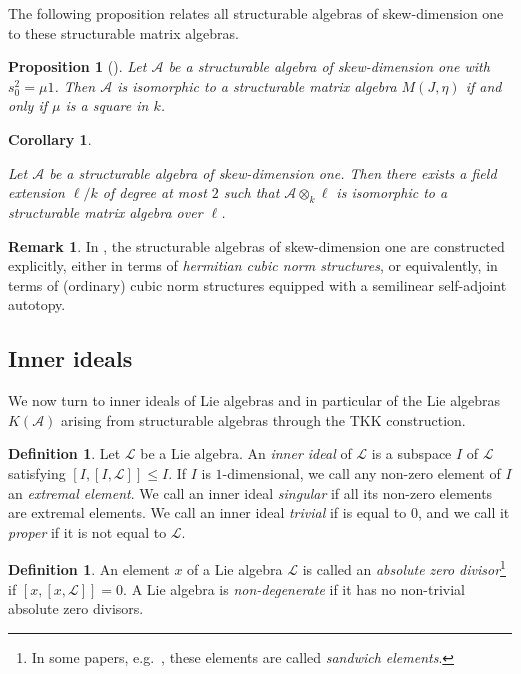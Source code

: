 \documentclass[oneside,a4paper]{amsart} %
\newtheorem{proposition}[theorem]{Proposition}
\newtheorem{corollary}[theorem]{Corollary}
\theoremstyle{definition}
\newtheorem{remark}[theorem]{Remark}
\newtheorem{definition}[theorem]{Definition}
\newcommand{\A}{\mathcal{A}}
\newcommand{\LL}{\mathcal{L}}
\numberwithin{equation}{section}
\begin{document}
The following proposition relates all structurable algebras of skew-dimension one to these structurable matrix algebras.

\begin{proposition}[{\cite[Proposition 4.5]{Allison1984}}]
	Let $\A$ be a structurable algebra of skew-dimension one with $s_0^2 = \mu 1$. 
	Then $\A$ is isomorphic to a structurable matrix algebra $M(J,\eta)$ if and only if $\mu$ is a square in $k$.
\end{proposition} 

\begin{corollary}
	\label{Skew dim 1 form of}

	Let $\A$ be a structurable algebra of skew-dimension one. 
	Then there exists a field extension $\ell/k$ of degree at most $2$ such that ${\A} \otimes_{k}  {\ell}$ is isomorphic to a structurable matrix algebra over $\ell$.
\end{corollary}

\begin{remark}
    In \cite{DeMedts2019}, the structurable algebras of skew-dimension one are constructed explicitly, either in terms of \textit{hermitian cubic norm structures}, or equivalently, in terms of (ordinary) cubic norm structures equipped with a semilinear self-adjoint autotopy.
\end{remark}




\subsection{Inner ideals}

We now turn to inner ideals of Lie algebras and in particular of the Lie algebras $K(\A)$ arising from structurable algebras through the TKK construction.

\begin{definition}\label{def inner ideal}
Let $\LL$ be a Lie algebra. 
An \textit{inner ideal} of $\LL$ is a subspace $I$ of $\LL$ satisfying $[I,[I,\LL]]\leq I$.
If $I$ is $1$-dimensional, we call any non-zero element of $I$ an \textit{extremal element}.
We call an inner ideal \textit{singular} if all its non-zero elements are extremal elements.
We call an inner ideal \textit{trivial} if is equal to $0$, and we call it \textit{proper} if it is not equal to $\LL$.
\end{definition}

\begin{definition}
\label{definition zero divisor}
An element $x$ of a Lie algebra $\LL$ is called an \textit{absolute zero divisor}\footnote{In some papers, e.g.\@~\cite{Cohen2006}, these elements are called \textit{sandwich elements}.} if $[x,[x,\LL]]=0$.
A Lie algebra is \textit{non-degenerate} if it has no non-trivial absolute zero divisors. 
\end{definition}
\end{document}

